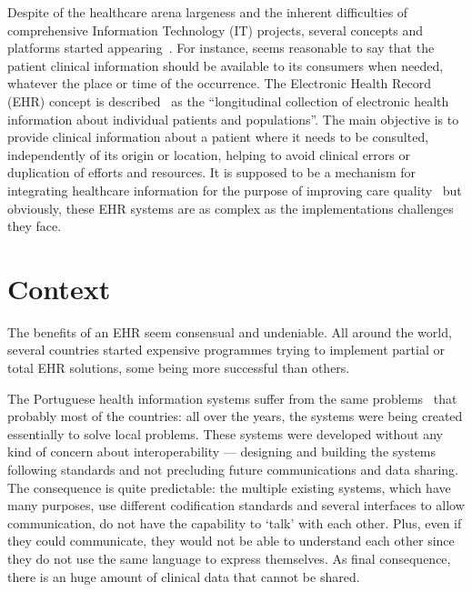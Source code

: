 Despite of the healthcare arena largeness and the inherent difficulties of comprehensive Information Technology (IT) projects, several concepts and platforms started appearing~\citep{Haux2006}. For instance, seems reasonable to say that the patient clinical information should be available to its consumers when needed, whatever the place or time of the occurrence. The Electronic Health Record (EHR) concept is described~\citep{Gunter2005} as the ``longitudinal collection of electronic health information about individual patients and populations''. The main objective is to provide clinical information about a patient where it needs to be consulted, independently of its origin or location, helping to avoid clinical errors or duplication of efforts and resources. It is supposed to be a mechanism for integrating healthcare information for the purpose of improving care quality~\citep{Orszag2008} but obviously, these EHR systems are as complex as the implementations challenges they face.

\section{Context} \label{sec:context}

The benefits of an EHR seem consensual and undeniable. All around the world, several countries started expensive programmes trying to implement partial or total EHR solutions, some being more successful than others.

The Portuguese health information systems suffer from the same problems~\citep{Deloitte2011} that probably most of the countries: all over the years, the systems were being created essentially to solve local problems. These systems were developed without any kind of concern about interoperability --- designing and building the systems following standards and not precluding future communications and data sharing. The consequence is quite predictable: the multiple existing systems, which have many purposes, use different codification standards and several interfaces to allow communication, do not have the capability to `talk' with each other. Plus, even if they could communicate, they would not be able to understand each other since they do not use the same language to express themselves. As final consequence, there is an huge amount of clinical data that cannot be shared.

